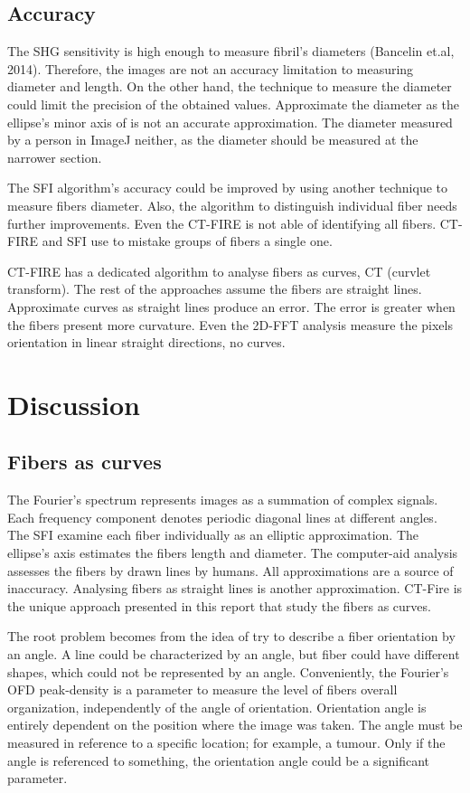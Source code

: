 \documentclass[12pt,a4paper]{article}
\begin{document}
\subsection{Accuracy}

The SHG sensitivity is high enough to measure fibril's diameters (Bancelin et.al, 2014). Therefore, the images are not an accuracy limitation to measuring diameter and length. On the other hand, the technique to measure the diameter could limit the precision of the obtained values. Approximate the diameter as the ellipse's minor axis of is not an accurate approximation. The diameter measured by a person in ImageJ neither, as the diameter should be measured at the narrower section.

The SFI algorithm's accuracy could be improved by using another technique to measure fibers diameter. Also, the algorithm to distinguish individual fiber needs further improvements. Even the CT-FIRE is not able of identifying all fibers. CT-FIRE and SFI use to mistake groups of fibers a single one. 

CT-FIRE has a dedicated algorithm to analyse fibers as curves, CT (curvlet transform). The rest of the approaches assume the fibers are straight lines. Approximate curves as straight lines produce an error. The error is greater when the fibers present more curvature. Even the 2D-FFT analysis measure the pixels orientation in linear straight directions, no curves. 

\section{Discussion}
\subsection{Fibers as curves}

The Fourier’s spectrum represents images as a summation of complex signals. Each frequency component denotes periodic diagonal lines at different angles. The SFI examine each fiber individually as an elliptic approximation. The ellipse's axis estimates the fibers length and diameter. The computer-aid analysis assesses the fibers by drawn lines by humans. All approximations are a source of inaccuracy. Analysing fibers as straight lines is another approximation. CT-Fire is the unique approach presented in this report that study the fibers as curves. 

The root problem becomes from the idea of try to describe a fiber orientation by an angle. A line could be characterized by an angle, but fiber could have different shapes, which could not be represented by an angle. Conveniently, the Fourier’s OFD peak-density is a parameter to measure the level of fibers overall organization, independently of the angle of orientation.  Orientation angle is entirely dependent on the position where the image was taken. The angle must be measured in reference to a specific location; for example, a tumour. Only if the angle is referenced to something, the orientation angle could be a significant parameter. 
\end{document}
